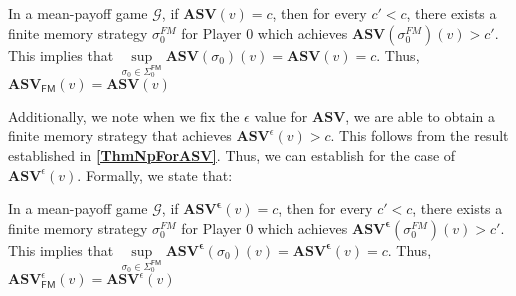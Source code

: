 \begin{corollary}
\label{CorASVEqASVFinNonEps}
In a mean-payoff game $\mathcal{G}$, if $\mathbf{ASV}(v) = c$, then for every $c' < c$, there exists a finite memory strategy $\sigma_0^{FM}$ for Player 0 which achieves $\mathbf{ASV}(\sigma_0^{FM})(v) > c'$. This implies that $\sup\limits_{\sigma_0 \in \Sigma_0^{\mathsf{FM}}} \mathbf{ASV}(\sigma_0)(v) = \mathbf{ASV}(v) = c$. Thus, $\mathbf{ASV}_{\mathsf{FM}}(v) = \mathbf{ASV}(v)$
\end{corollary}

Additionally, we note when we fix the $\epsilon$ value for $\mathbf{ASV}$, we are able to obtain a finite memory strategy that achieves $\mathbf{ASV}^{\epsilon}(v) > c$. This follows from the result established in \textbf{\cref{ThmNpForASV}}. Thus, we can establish \textbf{} for the case of $\mathbf{ASV}^{\epsilon}(v)$. Formally, we state that:

\begin{corollary}
\label{CorASVEqASVFin}
In a mean-payoff game $\mathcal{G}$, if $\mathbf{ASV^{\epsilon}}(v) = c$, then for every $c' < c$, there exists a finite memory strategy $\sigma_0^{FM}$ for Player 0 which achieves $\mathbf{ASV^{\epsilon}}(\sigma_0^{FM})(v) > c'$. This implies that $\sup\limits_{\sigma_0 \in \Sigma_0^{\mathsf{FM}}} \mathbf{ASV^{\epsilon}}(\sigma_0)(v) = \mathbf{ASV^{\epsilon}}(v) = c$. Thus, $\mathbf{ASV}^{\epsilon}_{\mathsf{FM}}(v) = \mathbf{ASV}^{\epsilon}(v)$
\end{corollary}